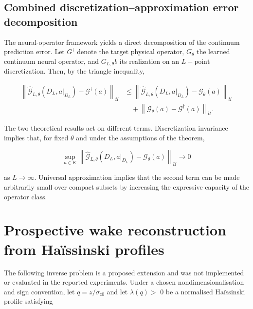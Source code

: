 \subsection{Combined discretization–approximation error decomposition}
\label{sec:auxiliary_theoretical_results_combined_discretization_approximation_error_decomposition}

The neural-operator framework yields a direct decomposition of the continuum prediction error. Let \(G^{\dagger}\) denote the target physical operator, \(G_{\theta}\) the learned continuum neural operator, and \(G_{L , \theta} b\) its realization on an \(L - \mathrm{point}\) discretization. Then, by the triangle inequality,

\[
\begin{aligned}
\left\|\widehat{\mathcal G}_{L,\theta}(D_L,a|_{D_L})-\mathcal G^{\dagger}(a)\right\|_{\mathcal U}
&\le\left\|\widehat{\mathcal G}_{L,\theta}(D_L,a|_{D_L})-\mathcal G_\theta(a)\right\|_{\mathcal U}\\
&\quad+\left\|\mathcal G_\theta(a)-\mathcal G^{\dagger}(a)\right\|_{\mathcal U}.
\end{aligned}
\]

The two theoretical results act on different terms. Discretization invariance implies that, for fixed \(\theta\) and under the assumptions of the theorem,

\begin{equation}
\label{eq:257}
\sup_{a\in K}\left\|\widehat{\mathcal G}_{L,\theta}(D_L,a|_{D_L})-\mathcal G_{\theta}(a)\right\|_{\mathcal U}\to0
\end{equation}

as \(L \to \infty .\) Universal approximation implies that the second term can be made arbitrarily small over compact subsets by increasing the expressive capacity of the operator class.

\section{Prospective wake reconstruction from Haïssinski profiles}
\label{sec:auxiliary_theoretical_results_prospective_wake_reconstruction_from_ha_ssinski_profiles}

The following inverse problem is a proposed extension and was not implemented or evaluated in the reported experiments. Under a chosen nondimensionalisation and sign convention, let \(q = z / \sigma_{z 0}\) and let \(\lambda ( q ) >\) 0 be a normalised Haïssinski profile satisfying

